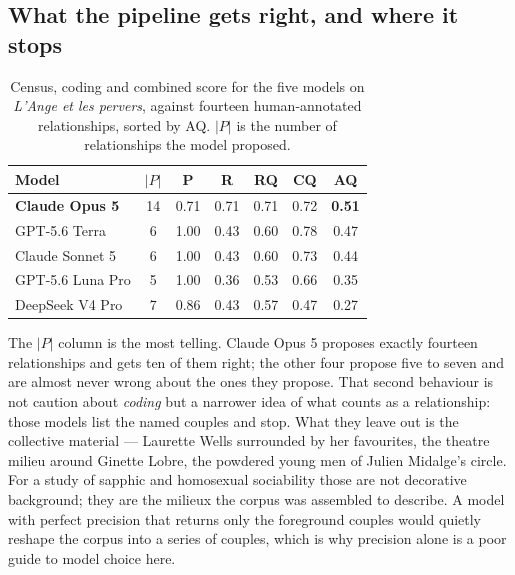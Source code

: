 \subsection{What the pipeline gets right, and where it stops}

\begin{table}[h]
  \centering
  \small
  \begin{tabular}{lcccccc}
    \toprule
    Model & $|P|$ & P & R & RQ & CQ & AQ \\
    \midrule
    \textbf{Claude Opus 5} & 14 & 0.71 & 0.71 & 0.71 & 0.72 & \textbf{0.51} \\
    GPT-5.6 Terra          &  6 & 1.00 & 0.43 & 0.60 & 0.78 & 0.47 \\
    Claude Sonnet 5        &  6 & 1.00 & 0.43 & 0.60 & 0.73 & 0.44 \\
    GPT-5.6 Luna Pro       &  5 & 1.00 & 0.36 & 0.53 & 0.66 & 0.35 \\
    DeepSeek V4 Pro        &  7 & 0.86 & 0.43 & 0.57 & 0.47 & 0.27 \\
    \bottomrule
  \end{tabular}
  \caption{Census, coding and combined score for the five models on
  \emph{L'Ange et les pervers}, against fourteen human-annotated relationships,
  sorted by AQ. $|P|$ is the number of relationships the model proposed.}
  \label{tab:model-results}
\end{table}

The $|P|$ column is the most telling. Claude Opus 5 proposes exactly fourteen
relationships and gets ten of them right; the other four propose five to seven
and are almost never wrong about the ones they propose. That second behaviour is
not caution about \emph{coding} but a narrower idea of what counts as a
relationship: those models list the named couples and stop. What they leave out
is the collective material --- Laurette Wells surrounded by her favourites, the
theatre milieu around Ginette Lobre, the powdered young men of Julien Midalge's
circle. For a study of sapphic and homosexual sociability those are not
decorative background; they are the milieux the corpus was assembled to
describe. A model with perfect precision that returns only the foreground
couples would quietly reshape the corpus into a series of couples, which is why
precision alone is a poor guide to model choice here.

